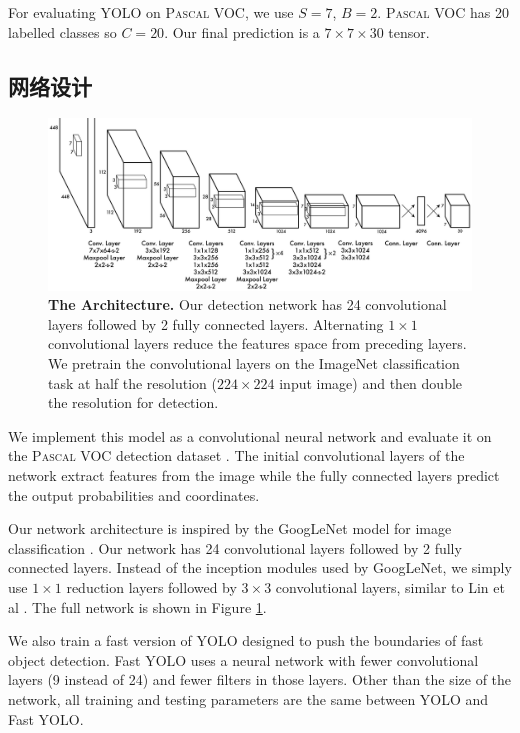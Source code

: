 \documentclass[10pt,twocolumn,letterpaper]{article}
\begin{document}
For evaluating YOLO on \textsc{Pascal} VOC, we use $S=7$, $B=2$. \textsc{Pascal} VOC has 20 labelled classes so $C=20$. Our final prediction is a $7 \times 7 \times 30$ tensor.


\subsection{网络设计}

   \begin{figure}[t]
      \centering
        \includegraphics[width=.8\linewidth]{net}
      \caption{\small \textbf{The Architecture.} Our detection network has 24 convolutional layers followed by 2 fully connected layers. Alternating $1 \times 1$ convolutional layers reduce the features space from preceding layers. We pretrain the convolutional layers on the ImageNet classification task at half the resolution ($224 \times 224$ input image) and then double the resolution for detection.}
      \label{net}
   \end{figure}

We implement this model as a convolutional neural network and evaluate it on the \textsc{Pascal} VOC detection dataset \cite{Everingham15}. The initial convolutional layers of the network extract features from the image while the fully connected layers predict the output probabilities and coordinates.

Our network architecture is inspired by the GoogLeNet model for image classification \cite{DBLP:journals/corr/SzegedyLJSRAEVR14}. Our network has 24 convolutional layers followed by 2 fully connected layers. Instead of the inception modules used by GoogLeNet, we simply use $1 \times 1$ reduction layers followed by $3 \times 3$ convolutional layers, similar to Lin et al \cite{DBLP:journals/corr/LinCY13}. The full network is shown in Figure \ref{net}.

We also train a fast version of YOLO designed to push the boundaries of fast object detection. Fast YOLO uses a neural network with fewer convolutional layers (9 instead of 24) and fewer filters in those layers. Other than the size of the network, all training and testing parameters are the same between YOLO and Fast YOLO.
\end{document}
